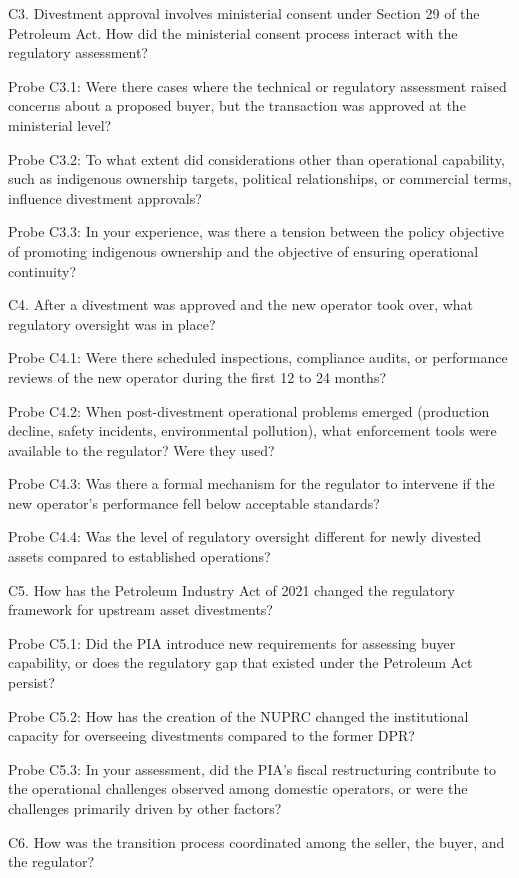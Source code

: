 C3. Divestment approval involves ministerial consent under Section 29 of
the Petroleum Act. How did the ministerial consent process interact with
the regulatory assessment?

Probe C3.1: Were there cases where the technical or regulatory
assessment raised concerns about a proposed buyer, but the transaction
was approved at the ministerial level?

Probe C3.2: To what extent did considerations other than operational
capability, such as indigenous ownership targets, political
relationships, or commercial terms, influence divestment approvals?

Probe C3.3: In your experience, was there a tension between the policy
objective of promoting indigenous ownership and the objective of
ensuring operational continuity?

C4. After a divestment was approved and the new operator took over, what
regulatory oversight was in place?

Probe C4.1: Were there scheduled inspections, compliance audits, or
performance reviews of the new operator during the first 12 to 24
months?

Probe C4.2: When post-divestment operational problems emerged
(production decline, safety incidents, environmental pollution), what
enforcement tools were available to the regulator? Were they used?

Probe C4.3: Was there a formal mechanism for the regulator to intervene
if the new operator's performance fell below acceptable standards?

Probe C4.4: Was the level of regulatory oversight different for newly
divested assets compared to established operations?

C5. How has the Petroleum Industry Act of 2021 changed the regulatory
framework for upstream asset divestments?

Probe C5.1: Did the PIA introduce new requirements for assessing buyer
capability, or does the regulatory gap that existed under the Petroleum
Act persist?

Probe C5.2: How has the creation of the NUPRC changed the institutional
capacity for overseeing divestments compared to the former DPR?

Probe C5.3: In your assessment, did the PIA's fiscal restructuring
contribute to the operational challenges observed among domestic
operators, or were the challenges primarily driven by other factors?

C6. How was the transition process coordinated among the seller, the
buyer, and the regulator?


